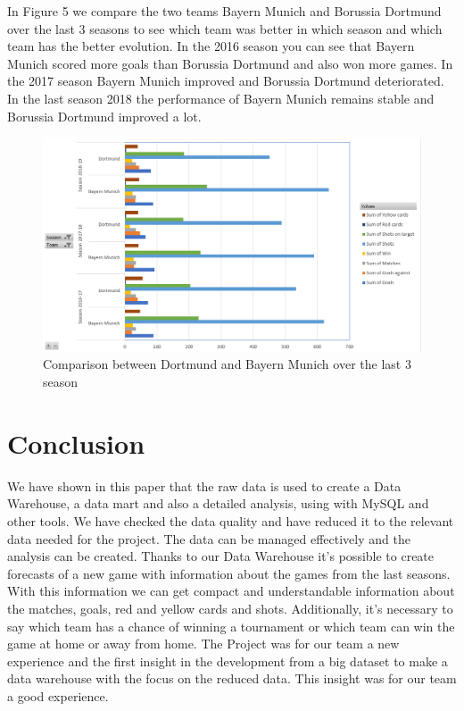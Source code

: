 \documentclass[11pt, journal]{IEEEtran}
\begin{document}
In Figure 5 we compare the two teams Bayern Munich and Borussia Dortmund over the last 3 seasons to see which team was better in which season and which team has the better evolution. In the 2016 season you can see that Bayern Munich scored more goals than Borussia Dortmund and also won more games. In the 2017 season Bayern Munich improved and Borussia Dortmund deteriorated. In the last season 2018 the performance of Bayern Munich remains stable and Borussia Dortmund improved a lot.
\begin{figure}[htb]
	\centering
		\includegraphics[width=1.0\columnwidth]{images/BarGraph_Comparison_BayernMunich-Dortmund_LastThreeSeasons}
	\caption{Comparison between Dortmund and Bayern Munich over the last 3 season}
	\label{fig:probov}
\end{figure}

\section{Conclusion} \label{sec:concl}
We have shown in this paper that the raw data is used to create a Data Warehouse, a data mart and also a detailed analysis, using with MySQL and other tools. We have checked the data quality and have reduced it to the relevant data needed for the project. The data can be managed effectively and the analysis can be created. Thanks to our Data Warehouse it’s possible to create forecasts of a new game with information about the games from the last seasons. With this information we can get compact and understandable information about the matches, goals, red and yellow cards and shots. Additionally, it’s necessary to say which team has a chance of winning a tournament or which team can win the game at home or away from home. The Project was for our team a new experience and the first insight in the development from a big dataset to make a data warehouse with the focus on the reduced data. This insight was for our team a good experience.



\end{document}
